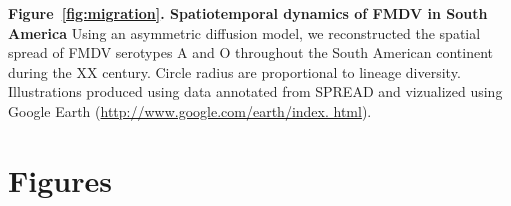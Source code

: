 \documentclass[10pt]{article}
\begin{document}
{\bf Figure~\ref{fig:migration}. Spatiotemporal dynamics of FMDV in South America} Using an asymmetric diffusion model, we reconstructed the spatial spread of FMDV serotypes A and O throughout the South American continent during the XX century.
Circle radius are proportional to lineage diversity.
Illustrations produced using data annotated from SPREAD \cite{spread} and vizualized using Google Earth (\url{http://www.google.com/earth/index.
html}).

\newpage
\section{Figures}
\begin{figure}[!ht]
\begin{center}
\\
\end{center}
\caption{}
\label{fig:trees}
\end{figure}
\end{document}
